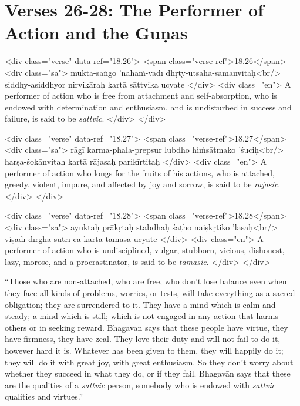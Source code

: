 \section{Verses 26-28: The Performer of Action and the Guṇas}\label{sec-verses-26-28-the-performer-of-action-and-the-gunas}


\begin{html}
<div class="verse" data-ref="18.26">
  <span class="verse-ref">18.26</span>
  <div class="sa">
    mukta-saṅgo ’nahaṁ-vādī dhṛty-utsāha-samanvitaḥ<br/>
    siddhy-asiddhyor nirvikāraḥ kartā sāttvika ucyate
  </div>
  <div class="en">
    A performer of action who is free from attachment and self-absorption, who is endowed with determination and enthusiasm, and is undisturbed in success and failure, is said to be \textit{sattvic}.
  </div>
</div>
\end{html}



\begin{html}
<div class="verse" data-ref="18.27">
  <span class="verse-ref">18.27</span>
  <div class="sa">
    rāgī karma-phala-prepsur lubdho hiṁsātmako ’śuciḥ<br/>
    harṣa-śokānvitaḥ kartā rājasaḥ parikīrtitaḥ
  </div>
  <div class="en">
    A performer of action who longs for the fruits of his actions, who is attached, greedy, violent, impure, and affected by joy and sorrow, is said to be \textit{rajasic}.
  </div>
</div>
\end{html}



\begin{html}
<div class="verse" data-ref="18.28">
  <span class="verse-ref">18.28</span>
  <div class="sa">
    ayuktaḥ prākṛtaḥ stabdhaḥ śaṭho naiṣkṛtiko ’lasaḥ<br/>
    viṣādī dīrgha-sūtrī ca kartā tāmasa ucyate
  </div>
  <div class="en">
    A performer of action who is undisciplined, vulgar, stubborn, vicious, dishonest, lazy, morose, and a procrastinator, is said to be \textit{tamasic}.
  </div>
</div>
\end{html}


\enquote{Those who are non-attached, who are free, who don’t lose balance even when they face all kinds of problems, worries, or tests, will take everything as a sacred obligation; they are surrendered to it. They have a mind which is calm and steady; a mind which is still; which is not engaged in any action that harms others or in seeking reward. Bhagavān says that these people have virtue, they have firmness, they have zeal. They love their duty and will not fail to do it, however hard it is. Whatever has been given to them, they will happily do it; they will do it with great joy, with great enthusiasm. So they don’t worry about whether they succeed in what they do, or if they fail. Bhagavān says that these are the qualities of a \textit{sattvic} person, somebody who is endowed with \textit{sattvic} qualities and virtues.}

